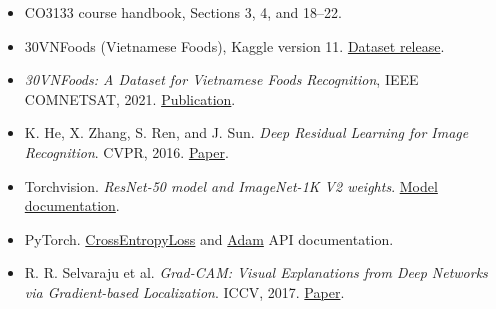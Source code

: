 \begin{itemize}
  \item CO3133 course handbook, Sections 3, 4, and 18--22.
  \item 30VNFoods (Vietnamese Foods), Kaggle version 11. \href{https://www.kaggle.com/datasets/quandang/vietnamese-foods/versions/11}{Dataset release}.
  \item \emph{30VNFoods: A Dataset for Vietnamese Foods Recognition}, IEEE COMNETSAT, 2021. \href{https://doi.org/10.1109/COMNETSAT53002.2021.9530774}{Publication}.
  \item K. He, X. Zhang, S. Ren, and J. Sun. \emph{Deep Residual Learning for Image Recognition}. CVPR, 2016. \href{https://arxiv.org/abs/1512.03385}{Paper}.
  \item Torchvision. \emph{ResNet-50 model and ImageNet-1K V2 weights}. \href{https://docs.pytorch.org/vision/stable/models/generated/torchvision.models.resnet50.html}{Model documentation}.
  \item PyTorch. \href{https://docs.pytorch.org/docs/2.14/generated/torch.nn.CrossEntropyLoss.html}{CrossEntropyLoss} and \href{https://docs.pytorch.org/docs/2.14/generated/torch.optim.Adam.html}{Adam} API documentation.
  \item R. R. Selvaraju et al. \emph{Grad-CAM: Visual Explanations from Deep Networks via Gradient-based Localization}. ICCV, 2017. \href{https://arxiv.org/abs/1610.02391}{Paper}.
\end{itemize}
